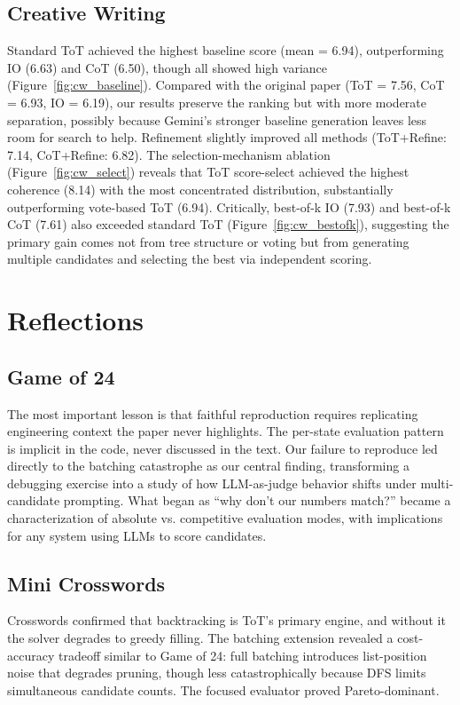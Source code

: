 \documentclass[11pt]{article}
\begin{document}
\subsection*{Creative Writing}
Standard ToT achieved the highest baseline score (mean = 6.94), outperforming IO (6.63) and CoT (6.50), though all showed high variance (Figure~\ref{fig:cw_baseline}). Compared with the original paper (ToT = 7.56, CoT = 6.93, IO = 6.19), our results preserve the ranking but with more moderate separation, possibly because Gemini's stronger baseline generation leaves less room for search to help. Refinement slightly improved all methods (ToT+Refine: 7.14, CoT+Refine: 6.82). The selection-mechanism ablation (Figure~\ref{fig:cw_select}) reveals that ToT score-select achieved the highest coherence (8.14) with the most concentrated distribution, substantially outperforming vote-based ToT (6.94). Critically, best-of-k IO (7.93) and best-of-k CoT (7.61) also exceeded standard ToT (Figure~\ref{fig:cw_bestofk}), suggesting the primary gain comes not from tree structure or voting but from generating multiple candidates and selecting the best via independent scoring.

\section{Reflections}

\subsection*{Game of 24}
The most important lesson is that faithful reproduction requires replicating engineering context the paper never highlights. The per-state evaluation pattern is implicit in the code, never discussed in the text. Our failure to reproduce led directly to the batching catastrophe as our central finding, transforming a debugging exercise into a study of how LLM-as-judge behavior shifts under multi-candidate prompting. What began as ``why don't our numbers match?'' became a characterization of absolute vs. competitive evaluation modes, with implications for any system using LLMs to score candidates.

\subsection*{Mini Crosswords}
Crosswords confirmed that backtracking is ToT's primary engine, and without it the solver degrades to greedy filling. The batching extension revealed a cost-accuracy tradeoff similar to Game of 24: full batching introduces list-position noise that degrades pruning, though less catastrophically because DFS limits simultaneous candidate counts. The focused evaluator proved Pareto-dominant.
\end{document}
